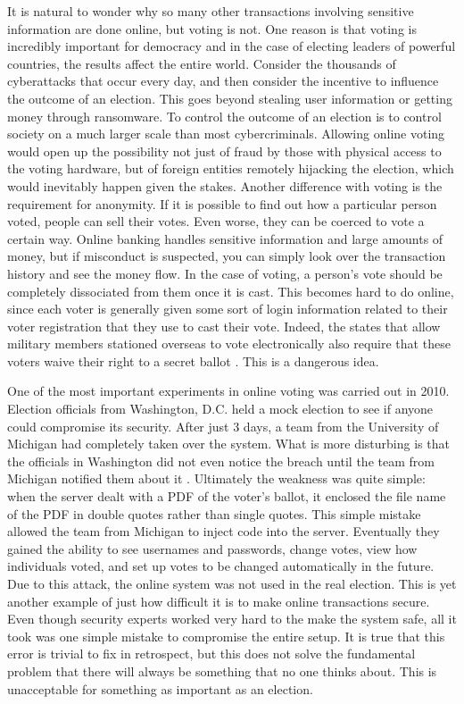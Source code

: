 \documentclass[12pt, titlepage]{article}
\begin{document}
It is natural to wonder why so many other transactions involving sensitive information are done online, but voting is not. One reason is that voting is incredibly important for democracy and in the case of electing leaders of powerful countries, the results affect the entire world. Consider the thousands of cyberattacks that occur every day, and then consider the incentive to influence the outcome of an election. This goes beyond stealing user information or getting money through ransomware. To control the outcome of an election is to control society on a much larger scale than most cybercriminals. Allowing online voting would open up the possibility not just of fraud by those with physical access to the voting hardware, but of foreign entities remotely hijacking the election, which would inevitably happen given the stakes. Another difference with voting is the requirement for anonymity. If it is possible to find out how a particular person voted, people can sell their votes. Even worse, they can be coerced to vote a certain way. Online banking handles sensitive information and large amounts of money, but if misconduct is suspected, you can simply look over the transaction history and see the money flow. In the case of voting, a person's vote should be completely dissociated from them once it is cast. This becomes hard to do online, since each voter is generally given some sort of login information related to their voter registration that they use to cast their vote. Indeed, the states that allow military members stationed overseas to vote electronically also require that these voters waive their right to a secret ballot \cite{waivesecret}. This is a dangerous idea.

One of the most important experiments in online voting was carried out in 2010. Election officials from Washington, D.C. held a mock election to see if anyone could compromise its security. After just 3 days, a team from the University of Michigan had completely taken over the system. What is more disturbing is that the officials in Washington did not even notice the breach until the team from Michigan notified them about it \cite{hao2016real}. Ultimately the weakness was quite simple: when the server dealt with a PDF of the voter's ballot, it enclosed the file name of the PDF in double quotes rather than single quotes. This simple mistake allowed the team from Michigan to inject code into the server. Eventually they gained the ability to see usernames and passwords, change votes, view how individuals voted, and set up votes to be changed automatically in the future. Due to this attack, the online system was not used in the real election. This is yet another example of just how difficult it is to make online transactions secure. Even though security experts worked very hard to the make the system safe, all it took was one simple mistake to compromise the entire setup. It is true that this error is trivial to fix in retrospect, but this does not solve the fundamental problem that there will always be something that no one thinks about. This is unacceptable for something as important as an election.
\end{document}
